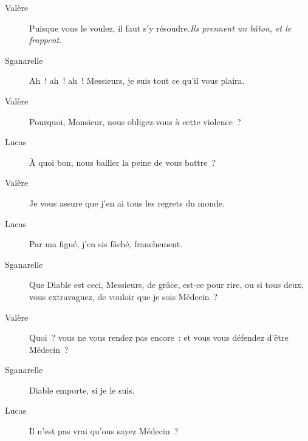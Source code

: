 \documentclass[french,twoside]{book} %
\begin{document}
 \begin{description} \item[Valère] 

Puisque vous le voulez, il faut s’y résoudre.\textit{Ils prennent un bâton, et le frappent.} \end{description}
 \begin{description} \item[Sganarelle] 

Ah ! ah ! ah ! Messieurs, je suis tout ce qu’il vous plaira.\end{description}
 \begin{description} \item[Valère] 

Pourquoi, Monsieur, nous obligez-vous à cette violence ?\end{description}
 \begin{description} \item[Lucas] 

À quoi bon, nous bailler la peine de vous battre ?\end{description}
 \begin{description} \item[Valère] 

Je vous assure que j’en ai tous les regrets du monde.\end{description}
 \begin{description} \item[Lucas] 

Par ma figué, j’en sis fâché, franchement.\end{description}
 \begin{description} \item[Sganarelle] 

Que Diable est ceci, Messieurs, de grâce, est-ce pour rire, ou si tous deux, vous extravaguez, de vouloir que je sois Médecin ?\end{description}
 \begin{description} \item[Valère] 

Quoi ? vous ne vous rendez pas encore : et vous vous défendez d’être Médecin ?\end{description}
 \begin{description} \item[Sganarelle] 

Diable emporte, si je le suis.\end{description}
 \begin{description} \item[Lucas] 

Il n’est pas vrai qu’ous sayez Médecin ?\end{description}
\end{document}
